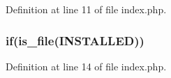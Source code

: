 Definition at line 11 of file index.\+php.

\subsubsection[{\texorpdfstring{if}{if}}]{\setlength{\rightskip}{0pt plus 5cm}if(is\+\_\+file(\textquotesingle{}I\+N\+S\+T\+A\+L\+L\+ED\textquotesingle{}))}\hypertarget{installation_2index_8php_a8b40f235228230e7d34abc26ab95dedc}{}\label{installation_2index_8php_a8b40f235228230e7d34abc26ab95dedc}


Definition at line 14 of file index.\+php.

